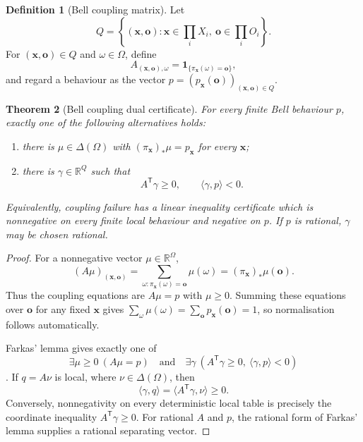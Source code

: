 \documentclass[11pt]{article}
\theoremstyle{plain}
\newtheorem{theorem}{Theorem}[section]
\theoremstyle{definition}
\newtheorem{definition}[theorem]{Definition}
\theoremstyle{remark}
\begin{document}
\begin{definition}[Bell coupling matrix]\label{def:bell-matrix}
Let
\[
Q=\left\{(\mathbf x,\mathbf o):
\mathbf x\in\prod_iX_i,\ 
\mathbf o\in\prod_iO_i\right\}.
\]
For $(\mathbf x,\mathbf o)\in Q$ and $\omega\in\Omega$, define
\[
A_{(\mathbf x,\mathbf o),\omega}
=\mathbf 1_{\{\pi_{\mathbf x}(\omega)=\mathbf o\}},
\]
and regard a behaviour as the vector
$p=(p_{\mathbf x}(\mathbf o))_{(\mathbf x,\mathbf o)\in Q}$.
\end{definition}

\begin{theorem}[Bell coupling dual certificate]\label{thm:bell-dual}
For every finite Bell behaviour $p$, exactly one of the following alternatives
holds:
\begin{enumerate}[label=(\roman*)]
\item there is $\mu\in\Delta(\Omega)$ with
$(\pi_{\mathbf x})_*\mu=p_{\mathbf x}$ for every $\mathbf x$;
\item there is $\gamma\in\mathbb R^Q$ such that
\[
A^{\mathsf T}\gamma\ge0,
\qquad
\langle\gamma,p\rangle<0.
\]
\end{enumerate}
Equivalently, coupling failure has a linear inequality certificate which is
nonnegative on every finite local behaviour and negative on $p$. If $p$ is
rational, $\gamma$ may be chosen rational.
\end{theorem}

\begin{proof}
For a nonnegative vector $\mu\in\mathbb R^\Omega$,
\[
(A\mu)_{(\mathbf x,\mathbf o)}
=\sum_{\omega:\pi_{\mathbf x}(\omega)=\mathbf o}\mu(\omega)
=(\pi_{\mathbf x})_*\mu(\mathbf o).
\]
Thus the coupling equations are $A\mu=p$ with $\mu\ge0$. Summing these
equations over $\mathbf o$ for any fixed $\mathbf x$ gives
$\sum_\omega\mu(\omega)=\sum_{\mathbf o}p_{\mathbf x}(\mathbf o)=1$, so
normalisation follows automatically.

Farkas' lemma gives exactly one of
\[
\exists\mu\ge0\ (A\mu=p)
\quad\text{and}\quad
\exists\gamma\ (A^{\mathsf T}\gamma\ge0,
\ \langle\gamma,p\rangle<0)
\]
\cite{schrijver}. If $q=A\nu$ is local, where
$\nu\in\Delta(\Omega)$, then
\[
\langle\gamma,q\rangle
=\langle A^{\mathsf T}\gamma,\nu\rangle\ge0.
\]
Conversely, nonnegativity on every deterministic local table is precisely the
coordinate inequality $A^{\mathsf T}\gamma\ge0$. For rational $A$ and $p$, the
rational form of Farkas' lemma supplies a rational separating vector.
\end{proof}
\end{document}
